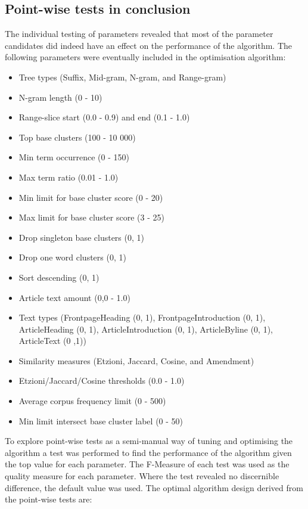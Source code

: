 \subsection{Point-wise tests in conclusion}
\label{subsec:incrementalconclusion}
The individual testing of parameters revealed that most of the parameter candidates did indeed have an effect on the performance of the \CTC algorithm. The following parameters were eventually included in the optimisation algorithm:
\begin{itemize}
  \item Tree types (Suffix, Mid-gram, N-gram, and Range-gram)
  \item N-gram length (0 - 10)
  \item Range-slice start (0.0 - 0.9) and end (0.1 - 1.0)
  \item Top base clusters (100 - 10 000)
  \item Min term occurrence (0 - 150)
  \item Max term ratio (0.01 - 1.0)
  \item Min limit for base cluster score (0 - 20)
  \item Max limit for base cluster score (3 - 25)
  \item Drop singleton base clusters (0, 1)
  \item Drop one word clusters (0, 1)
  \item Sort descending (0, 1)
  \item Article text amount (0,0 - 1.0)
  \item Text types (FrontpageHeading (0, 1), FrontpageIntroduction (0, 1), ArticleHeading (0, 1), ArticleIntroduction (0, 1), ArticleByline (0, 1), ArticleText (0 ,1))
  \item Similarity measures (Etzioni, Jaccard, Cosine, and Amendment)
  \item Etzioni/Jaccard/Cosine thresholds (0.0 - 1.0)
  \item Average corpus frequency limit (0 - 500)
  \item Min limit intersect base cluster label (0 - 50)
\end{itemize}
To explore point-wise tests as a semi-manual way of tuning and optimising the algorithm a test was performed to find the performance of the algorithm given the top value for each parameter. The F-Measure of each test was used as the quality measure for each parameter. Where the test revealed no discernible difference, the default value was used. The optimal algorithm design derived from the point-wise tests are:

